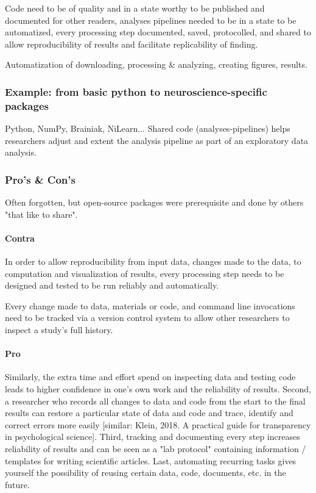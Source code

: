 Code need to be of quality and in a state worthy to be published and documented
for other readers, analyses pipelines needed to be in a state to be automatized,
every processing step documented, saved, protocolled, and shared to allow
reproducibility of results and facilitate replicability of finding.

Automatization of downloading, processing \& analyzing, creating figures,
results.





\subsubsection{Example: from basic python to neuroscience-specific packages}



Python, NumPy, Brainiak, NiLearn...
%
Shared code (analyses-pipelines) helps researchers adjust
and extent the analysis pipeline as part of an exploratory data analysis.

\subsubsection{Pro's \& Con's}

Often forgotten, but open-source packages were prerequisite and done by others
"that like to share".

\paragraph{Contra}

%
In order to allow reproducibility from input data, changes made to the data, to
computation and visualization of results, every processing step needs to be
designed and tested to be run reliably and automatically.

%
Every change made to data, materials or code, and command line invocations need
to be tracked via a version control system \citep[e.g.,][]{halchenko2021datalad}
to allow other researchers to inspect a study's full history.


\paragraph{Pro}

Similarly, the extra time and effort spend on inspecting data and testing code
leads to higher confidence in one's own work and the reliability of results.
%
Second, a researcher who records all changes to data and code from the start to
the final results can restore a particular state of data and code and trace,
identify and correct errors more easily [similar: Klein, 2018. A practical guide
for transparency in psychological science].
%
Third, tracking and documenting every step increases reliability of results and
can be seen as a "lab protocol" containing information / templates for writing
scientific articles.
%
Last, automating recurring tasks gives yourself the possibility of reusing
certain data, code, documents, etc. in the future.


